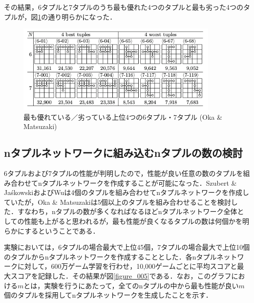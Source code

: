 \documentclass{suribt}
\begin{document}
その結果，6タプルと7タプルのうち最も優れた4つのタプルと最も劣った4つのタプルが，図\ref{figure_004}の通り明らかになった．

\begin{figure}[t]
	\begin{center}
	\includegraphics[width=10cm]{figure_004.png}
	\caption{最も優れている／劣っている上位4つの6タプル・7タプル (Oka \& Matsuzaki)}
	\label{figure_004}
	\end{center}
\end{figure}

\subsection{nタプルネットワークに組み込むnタプルの数の検討}
6タプルおよび7タプルの性能が判明したので，性能が良い任意の数のタプルを組み合わせてnタプルネットワークを作成することが可能になった．Szubert \& Ja\'{s}kowskiおよびWuは4個のタプルを組み合わせてnタプルネットワークを作成していたが，Oka \& Matsuzakiは5個以上のタプルを組み合わせることを検討した．すなわち，nタプルの数が多くなればなるほどnタプルネットワーク全体としての性能も上がると思われるが，最も性能が良くなるタプルの数は何個かを明らかにするということである．

実験においては，6タプルの場合最大で上位45個，7タプルの場合最大で上位10個のタプルからnタプルネットワークを作成することとした．各nタプルネットワークに対して，600万ゲーム学習を行わせ，10,000ゲームごとに平均スコアと最大スコアを記録した．その結果が図\ref{figure_005}である．なお，このグラフにおける$m$とは，実験を行うにあたって，全てのnタプルの中から最も性能が良い$m$個のタプルを採用してnタプルネットワークを生成したことを示す．
\end{document}
